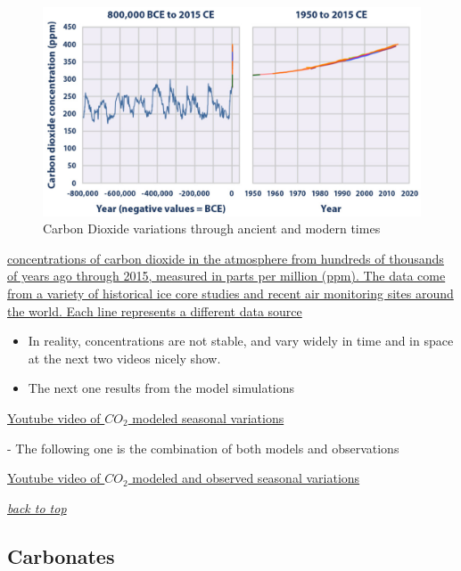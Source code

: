 \documentclass[]{book}
\theoremstyle{definition}
\theoremstyle{definition}
\theoremstyle{definition}
\theoremstyle{remark}
\begin{document}
\begin{figure}
\centering
\includegraphics{pictures/CO2_atm_concentrations.png}
\caption{Carbon Dioxide variations through ancient and modern times}
\end{figure}

\href{https://https://www.epa.gov/sites/production/files/2016-08/documents/print_ghg-concentrations-2016.pdf}{concentrations
of carbon dioxide in the atmosphere from hundreds of thousands of years
ago through 2015, measured in parts per million (ppm). The data come
from a variety of historical ice core studies and recent air monitoring
sites around the world. Each line represents a different data source}
\citep{Epa2016-yj}

\begin{itemize}
\item
  In reality, concentrations are not stable, and vary widely in time and
  in space at the next two videos nicely show.
\item
  The next one results from the model simulations
\end{itemize}

\href{https://www.youtube.com/embed/WGHkY0E4FMY}{Youtube video of
\(CO_2\) modeled seasonal variations}

 - The following one is the combination of both models and observations

\href{https://www.youtube.com/embed/2BWWrJr6TJw}{Youtube video of
\(CO_2\) modeled and observed seasonal variations}

\emph{\protect\hyperlink{top}{back to top}}

\hypertarget{carbonates}{\subsection{Carbonates}\label{carbonates}}
\end{document}

